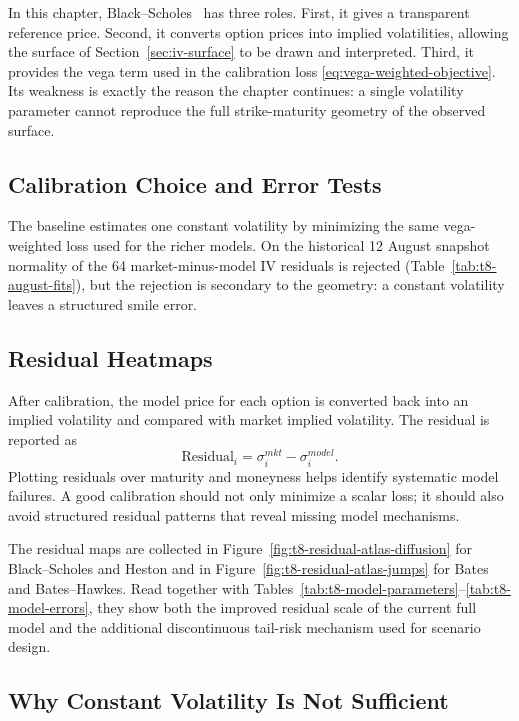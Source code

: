 In this chapter, Black--Scholes~\cite{BlackScholes1973} has three roles. First, it gives a transparent reference price. Second, it converts option prices into implied volatilities, allowing the surface of Section~\ref{sec:iv-surface} to be drawn and interpreted. Third, it provides the vega term used in the calibration loss \eqref{eq:vega-weighted-objective}. Its weakness is exactly the reason the chapter continues: a single volatility parameter cannot reproduce the full strike-maturity geometry of the observed surface.
\subsection{Calibration Choice and Error Tests}

The baseline estimates one constant volatility by minimizing the same vega-weighted loss used for the richer models. On the historical 12 August snapshot normality of the 64 market-minus-model IV residuals is rejected (Table~\ref{tab:t8-august-fits}), but the rejection is secondary to the geometry: a constant volatility leaves a structured smile error.
\subsection{Residual Heatmaps}

After calibration, the model price for each option is converted back into an implied volatility and compared with market implied volatility. The residual is reported as
\begin{equation}
    \text{Residual}_i
    =
    \sigma_i^{mkt}-\sigma_i^{model}.
\end{equation}
Plotting residuals over maturity and moneyness helps identify systematic model failures. A good calibration should not only minimize a scalar loss; it should also avoid structured residual patterns that reveal missing model mechanisms.

The residual maps are collected in Figure~\ref{fig:t8-residual-atlas-diffusion} for Black--Scholes and Heston and in Figure~\ref{fig:t8-residual-atlas-jumps} for Bates and Bates--Hawkes. Read together with Tables~\ref{tab:t8-model-parameters}--\ref{tab:t8-model-errors}, they show both the improved residual scale of the current full model and the additional discontinuous tail-risk mechanism used for scenario design.


\subsection{Why Constant Volatility Is Not Sufficient}

